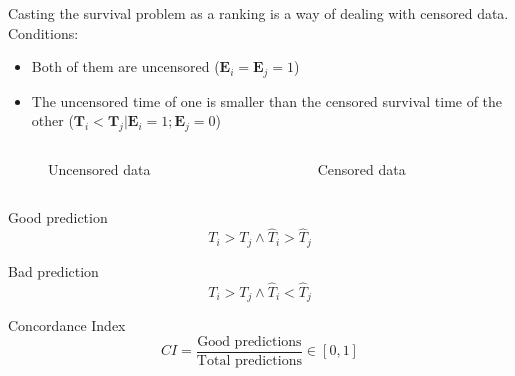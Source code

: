 \begin{frame}

  Casting the survival problem as a ranking is a way of dealing with censored data.
  Conditions:
  \begin{itemize}
    \item Both of them are uncensored (\( \bm{E}_i = \bm{E}_j = 1\))
    \item The uncensored time of one is smaller than the censored survival time of the other
    (\( \bm{T}_i < \bm{T}_j | \bm{E}_i = 1; \bm{E}_j = 0 \))
  \end{itemize}

  \begin{columns}
    \begin{column}{.5\textwidth}
      \begin{figure}
        \centering
        \scalebox{.8}{}
        \caption{Uncensored data}
      \end{figure}
    \end{column}
    \begin{column}{.5\textwidth}
      \begin{figure}
        \centering
        \scalebox{.8}{}
        \caption{Censored data}
      \end{figure}
    \end{column}
  \end{columns}
\end{frame}

\begin{frame}
  \begin{block}{Good prediction}
    \[
      T_i > T_j \land \hat{T}_i > \hat{T}_j
    \]
  \end{block}

  \begin{block}{Bad prediction}
    \[
      T_i > T_j \land \hat{T}_i < \hat{T}_j
    \]
  \end{block}

  \begin{block}{Concordance Index}
    \[
      CI = \frac{\text{Good predictions}}{\text{Total predictions}} \in [0, 1]
    \]
  \end{block}
\end{frame}

